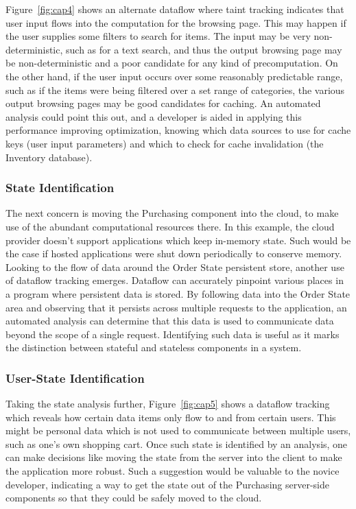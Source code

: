 \documentclass[msc,oneside]{ubcthesis}
\begin{document}
Figure~\ref{fig:cap4} shows an alternate dataflow where taint tracking indicates that user input flows into the computation for the browsing page. This may happen if the user supplies some filters to search for items. The input may be very non-deterministic, such as for a text search, and thus the output browsing page may be non-deterministic and a poor candidate for any kind of precomputation. On the other hand, if the user input occurs over some reasonably predictable range, such as if the items were being filtered over a set range of categories, the various output browsing pages may be good candidates for caching. An automated analysis could point this out, and a developer is aided in applying this performance improving optimization, knowing which data sources to use for cache keys (user input parameters) and which to check for cache invalidation (the Inventory database).

\subsubsection{State Identification}
The next concern is moving the Purchasing component into the cloud, to make use of the abundant computational resources there. In this example, the cloud provider doesn't support applications which keep in-memory state. Such would be the case if hosted applications were shut down periodically to conserve memory. Looking to the flow of data around the Order State persistent store, another use of dataflow tracking emerges. Dataflow can accurately pinpoint various places in a program where persistent data is stored. By following data into the Order State area and observing that it persists across multiple requests to the application, an automated analysis can determine that this data is used to communicate data beyond the scope of a single request. Identifying such data is useful as it marks the distinction between stateful and stateless components in a system.

\subsubsection{User-State Identification}
Taking the state analysis further, Figure~\ref{fig:cap5} shows a dataflow tracking which reveals how certain data items only flow to and from certain users. This might be personal data which is not used to communicate between multiple users, such as one's own shopping cart. Once such state is identified by an analysis, one can make decisions like moving the state from the server into the client to make the application more robust. Such a suggestion would be valuable to the novice developer, indicating a way to get the state out of the Purchasing server-side components so that they could be safely moved to the cloud.
\end{document}
